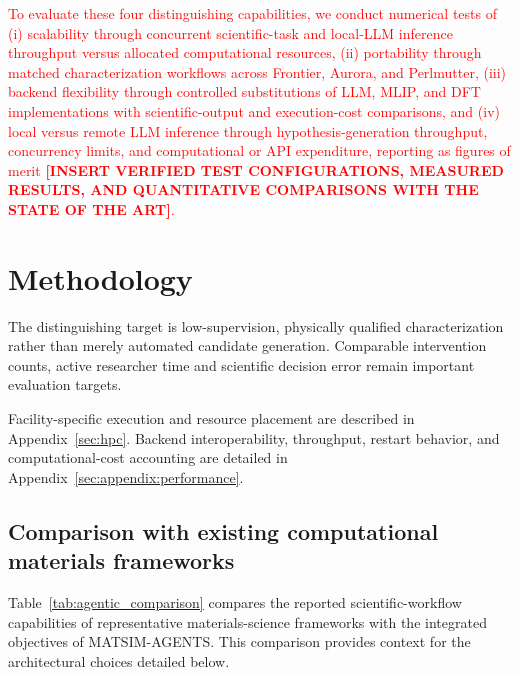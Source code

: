 \documentclass[11pt,a4paper]{article}
\begin{document}
\textcolor{red}{To evaluate these four distinguishing capabilities, we conduct numerical tests of (i) scalability through concurrent scientific-task and local-LLM inference throughput versus allocated computational resources, (ii) portability through matched characterization workflows across Frontier, Aurora, and Perlmutter, (iii) backend flexibility through controlled substitutions of LLM, MLIP, and DFT implementations with scientific-output and execution-cost comparisons, and (iv) local versus remote LLM inference through hypothesis-generation throughput, concurrency limits, and computational or API expenditure, reporting as figures of merit \textbf{[INSERT VERIFIED TEST CONFIGURATIONS, MEASURED RESULTS, AND QUANTITATIVE COMPARISONS WITH THE STATE OF THE ART]}.}





\section{Methodology}
\label{sec:architecture}




The distinguishing target is low-supervision, physically qualified characterization rather than merely automated candidate generation. Comparable intervention counts, active researcher time and scientific decision error remain important evaluation targets.

Facility-specific execution and resource placement are described in Appendix~\ref{sec:hpc}. Backend interoperability, throughput, restart behavior, and computational-cost accounting are detailed in Appendix~\ref{sec:appendix:performance}.

\subsection{Comparison with existing computational materials frameworks}
Table~\ref{tab:agentic_comparison} compares the reported scientific-workflow capabilities of representative materials-science frameworks with the integrated objectives of MATSIM-AGENTS. This comparison provides context for the architectural choices detailed below.
\end{document}
